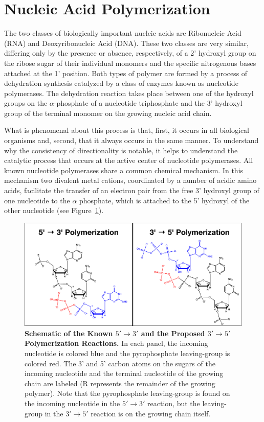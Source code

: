 \section*{Nucleic Acid Polymerization} %
\label{sec:nucleotide_polymerization}
The two classes of biologically important nucleic acids are Ribonucleic Acid (RNA) and Deoxyribonucleic Acid (DNA). These two classes are very similar, differing only by the presence or absence, respectively, of a 2' hydroxyl group on the ribose sugar of their individual monomers and the specific nitrogenous bases attached at the 1' position. Both types of polymer are formed by a process of dehydration synthesis catalyzed by a class of enzymes known as nucleotide polymerases. The dehydration reaction takes place between one of the hydroxyl groups on the $\alpha$-phosphate of a nucleotide triphosphate and the 3' hydroxyl group of the terminal monomer on the growing nucleic acid chain\cite{ZannisHadjopoulos:1999p952}.

What is phenomenal about this process is that, first, it occurs in all biological organisms and, second, that it always occurs in the same manner. To understand why the consistency of directionality is notable, it helps to understand the catalytic process that occurs at the active center of nucleotide polymerases. All known nucleotide polymerases share a common chemical mechanism. In this mechanism two divalent metal cations, coordinated by a number of acidic amino acids, facilitate the transfer of an electron pair from the free 3' hydroxyl group of one nucleotide to the $\alpha$ phosphate, which is attached to the 5' hydroxyl of the other nucleotide\cite{Castro:2009p953} (see Figure~\ref{fig:reactions}).

\begin{figure}[h]
	\centering
		\includegraphics[width=\textwidth]{reactions}
	\caption{\textbf{Schematic of the Known $5'\to3'$ and the Proposed $3'\to5'$ Polymerization Reactions.} In each panel, the incoming nucleotide is colored blue and the pyrophosphate leaving-group is colored red. The 3' and 5' carbon atoms on the sugars of the incoming nucleotide and the terminal nucleotide of the growing chain are labeled (R represents the remainder of the growing polymer). Note that the pyrophosphate leaving-group is found on the incoming nucleotide in the $5'\to3'$ reaction, but the leaving-group in the $3'\to5'$ reaction is on the growing chain itself.}
	\label{fig:reactions}
\end{figure}

